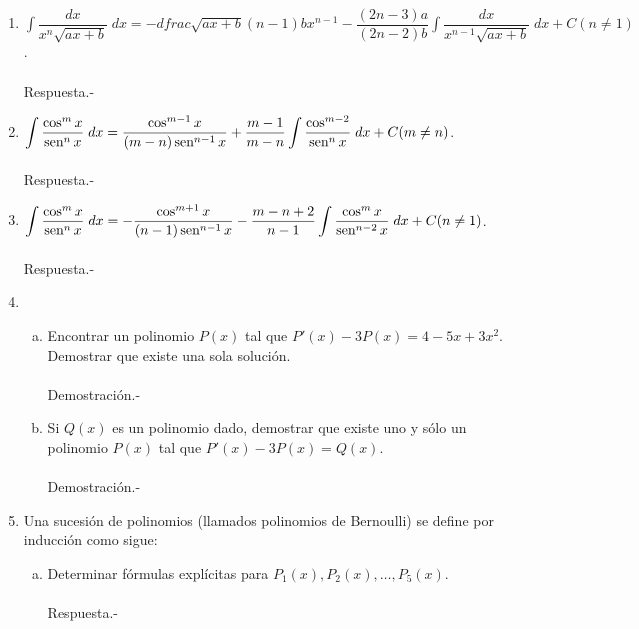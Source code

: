 \begin{enumerate}[\bfseries 1.]
    \item $\displaystyle\int \dfrac{dx}{x^n\sqrt{ax+b}}\; dx = -dfrac{\sqrt{ax+b}}{(n-1)bx^{n-1}}-\dfrac{(2n-3)a}{(2n-2)b}\int \dfrac{dx}{x^{n-1}\sqrt{ax+b}}\; dx + C(n\neq 1)$.\\\\
	Respuesta.-\; 

    \item $\displaystyle\int \dfrac{\cos^m x}{\mathop{\mbox{\normalfont sen}}\nolimits^n x}\; dx = \dfrac{\cos^{m-1}x}{(m-n)\mathop{\mbox{\normalfont sen}}\nolimits^{n-1}x}+\dfrac{m-1}{m-n}\int \dfrac{\cos^{m-2}}{\mathop{\mbox{\normalfont sen}}\nolimits^n x}\; dx + C (m\neq n)$.\\\\
	Respuesta.-\;

    \item $\displaystyle\int \dfrac{\cos^m x}{\mathop{\mbox{\normalfont sen}}\nolimits^n x}\; dx = -\dfrac{\cos^{m+1}x}{(n-1)\mathop{\mbox{\normalfont sen}}\nolimits^{n-1}x}-\dfrac{m-n+2}{n-1}\int \dfrac{\cos^m x}{\mathop{\mbox{\normalfont sen}}\nolimits^{n-2}x}\; dx + C (n\neq 1)$.\\\\
	Respuesta.-\;

    \item 
	\begin{enumerate}[a)]

	    \item Encontrar un polinomio $P(x)$ tal que $P'(x)-3P(x)=4-5x+3x^2$. Demostrar que existe una sola solución.\\\\
		Demostración.-\;

	    \item Si $Q(x)$ es un polinomio dado, demostrar que existe uno y sólo un polinomio $P(x)$ tal que $P'(x)-3P(x)=Q(x)$.\\\\
		Demostración.-\;

	\end{enumerate}

    \item Una sucesión de polinomios (llamados polinomios de Bernoulli) se define por inducción como sigue:

	\begin{enumerate}[a)]

	    \item Determinar fórmulas explícitas para $P_1(x),P_2(x),\ldots , P_5(x)$.\\\\
		Respuesta.-\;


\end{enumerate}
\end{enumerate}
